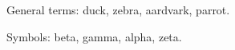 \documentclass{article}
\begin{document}
General terms: \gls{duck}, \gls{zebra}, \gls{aardvark},
\gls{parrot}.

Symbols: \gls{beta}, \gls{gamma}, \gls{alpha}, \gls{zeta}.

\printglossary[style=mcolindexgroup]
\printnoidxglossary[type=symbols,sort=use,style=index]
\end{document}
